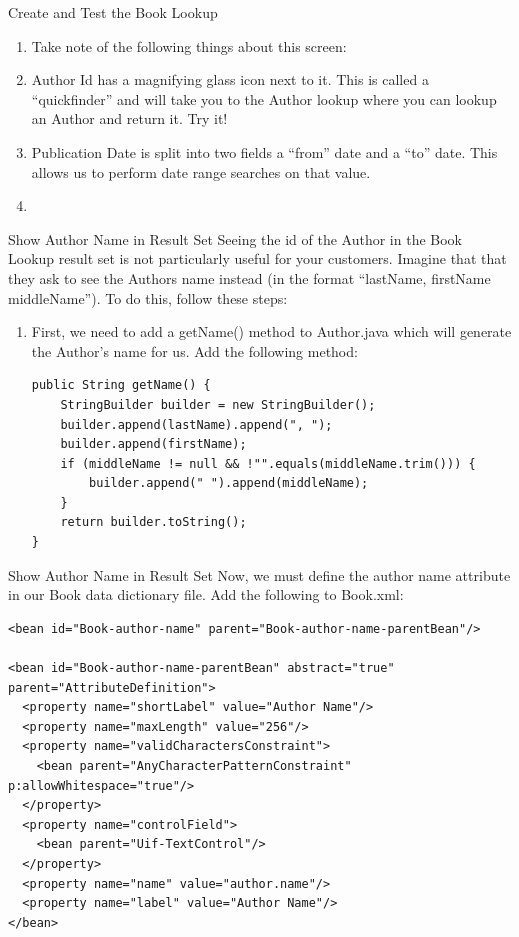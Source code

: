 \documentclass[xcolor=dvipsnames,14pt,professionalfonts]{beamer}
\begin{document}
          \begin{frame}{Create and Test the Book Lookup}
            \begin{enumerate}
            \item Take note of the following things about this screen:
              \item Author Id has a magnifying glass icon next to it.  This is called a “quickfinder” and will take you to the Author lookup where you can lookup an Author and return it.  Try it!
              \item Publication Date is split into two fields a “from”
                date and a “to” date.  This allows us to perform date
                range searches on that value.
              \item 
              \end{enumerate}
            \end{frame}
\begin{frame}[fragile]{Show Author Name in Result Set}
Seeing the id of the Author in the Book Lookup result set is not particularly useful for your customers.  Imagine that that they ask to see the Authors name instead (in the format “lastName, firstName middleName”).  To do this, follow these steps:
              \begin{enumerate}
              \item First, we need to add a getName() method to Author.java which will generate the Author’s name for us.  Add the following method:
    \begin{verbatim}
public String getName() {
	StringBuilder builder = new StringBuilder();
	builder.append(lastName).append(", ");
	builder.append(firstName);
	if (middleName != null && !"".equals(middleName.trim())) {
		builder.append(" ").append(middleName);
	}
	return builder.toString();
}
    \end{verbatim}
    \end{enumerate}
\end{frame}

\begin{frame}[fragile]{Show Author Name in Result Set}
Now, we must define the author name attribute in our Book data dictionary file.  Add the following to Book.xml:
    \begin{verbatim}
<bean id="Book-author-name" parent="Book-author-name-parentBean"/>

<bean id="Book-author-name-parentBean" abstract="true" parent="AttributeDefinition">
  <property name="shortLabel" value="Author Name"/>
  <property name="maxLength" value="256"/>
  <property name="validCharactersConstraint">
    <bean parent="AnyCharacterPatternConstraint" p:allowWhitespace="true"/>
  </property>
  <property name="controlField">
    <bean parent="Uif-TextControl"/>
  </property>
  <property name="name" value="author.name"/>
  <property name="label" value="Author Name"/>
</bean>
    \end{verbatim}
\end{frame}
\end{document}
